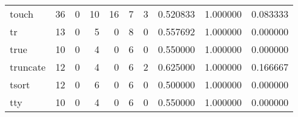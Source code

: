 \begin{tabular}{lrrrrrrrrr}
touch     &                                       36 &                                                  0 &                                                 10 &                                                 16 &                                                  7 &                                                  3 &                                           0.520833 &                               1.000000 &                             0.083333 \\
tr        &                                       13 &                                                  0 &                                                  5 &                                                  0 &                                                  8 &                                                  0 &                                           0.557692 &                               1.000000 &                             0.000000 \\
true      &                                       10 &                                                  0 &                                                  4 &                                                  0 &                                                  6 &                                                  0 &                                           0.550000 &                               1.000000 &                             0.000000 \\
truncate  &                                       12 &                                                  0 &                                                  4 &                                                  0 &                                                  6 &                                                  2 &                                           0.625000 &                               1.000000 &                             0.166667 \\
tsort     &                                       12 &                                                  0 &                                                  6 &                                                  0 &                                                  6 &                                                  0 &                                           0.500000 &                               1.000000 &                             0.000000 \\
tty       &                                       10 &                                                  0 &                                                  4 &                                                  0 &                                                  6 &                                                  0 &                                           0.550000 &                               1.000000 &                             0.000000 \\

\end{tabular}
